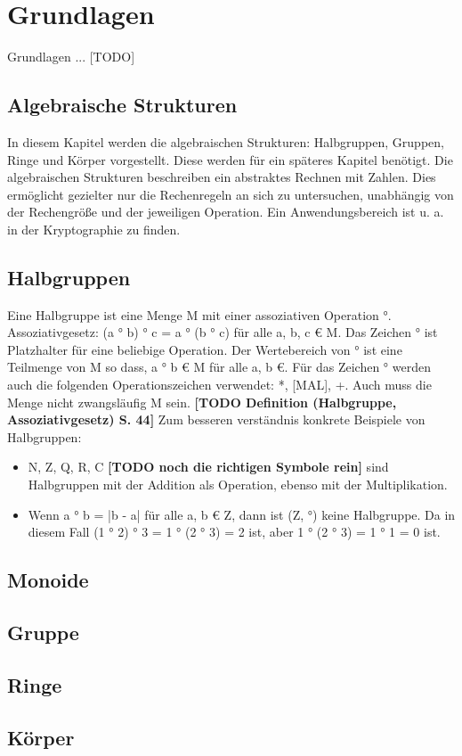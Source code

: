 \section{Grundlagen}
	Grundlagen ... [TODO]
	
	\subsection{Algebraische Strukturen}
		In diesem Kapitel werden die algebraischen Strukturen: Halbgruppen, Gruppen, Ringe und Körper vorgestellt. Diese werden für ein späteres Kapitel benötigt. Die algebraischen Strukturen beschreiben ein abstraktes Rechnen mit Zahlen. Dies ermöglicht gezielter nur die Rechenregeln an sich zu untersuchen, unabhängig von der Rechengröße und der jeweiligen Operation. Ein Anwendungsbereich ist u. a. in der Kryptographie zu finden. 
	
		\subsection{Halbgruppen}
			Eine Halbgruppe ist eine Menge M mit einer assoziativen Operation °. Assoziativgesetz: (a ° b) ° c = a ° (b ° c) für alle a, b, c € M. Das Zeichen ° ist Platzhalter für eine beliebige Operation. Der Wertebereich von ° ist eine Teilmenge von M so dass, a ° b € M für alle a, b €. Für das Zeichen ° werden auch die folgenden Operationszeichen verwendet: *, [MAL], +. Auch muss die Menge nicht zwangsläufig M sein. \textbf{[TODO Definition (Halbgruppe, Assoziativgesetz) S. 44]} Zum besseren verständnis konkrete Beispiele von Halbgruppen:
			
			\begin{itemize}
				\item N, Z, Q, R, C \textbf{[TODO noch die richtigen Symbole rein]} sind Halbgruppen mit der Addition als Operation, ebenso mit der Multiplikation.
				\item Wenn a ° b = |b - a| für alle a, b € Z, dann ist (Z, °) keine Halbgruppe. Da in diesem Fall (1 ° 2) ° 3 = 1 ° (2 ° 3) = 2 ist, aber 1 ° (2 ° 3) = 1 ° 1 = 0 ist.
			\end{itemize}
		
		\subsection{Monoide}
		
		
		\subsection{Gruppe}
		
		
		\subsection{Ringe}
		
		
		\subsection{Körper}